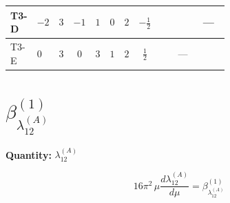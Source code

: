 \documentclass[8pt]{article}
\begin{document}
\begin{landscape}
\begin{longtable}{@{}llcccccc >{\raggedright\arraybackslash}p{0.21\linewidth} >{\raggedright\arraybackslash}p{0.21\linewidth} >{\raggedright\arraybackslash}p{0.21\linewidth}@{}}
\midrule
T3-D & $-2$ & $3$ & $-1$ & $1$ & $0$ & $2$ & $-\frac{1}{2}$ & \scriptsize\adjustbox{max width=\linewidth}{$\begin{gathered} -\frac{9 {g_1}^2 {\lambda_5}}{2}\end{gathered}$} & \scriptsize\adjustbox{max width=\linewidth}{$\begin{gathered} {\lambda_5} (T_{\nu}^{(1)}+2 T_{\nu}^{(2)}+6 \operatorname{Tr}\!\left({Y_d}\,\left({Y_d}\right)^{\dagger}\right)+2 \operatorname{Tr}\!\left({Y_e}\,\left({Y_e}\right)^{\dagger}\right)+6 \operatorname{Tr}\!\left({Y_u}\,\left({Y_u}\right)^{\dagger}\right)-4 {\lambda_{HS_1}^{(A)}})\end{gathered}$} & --- \\
\midrule
T3-E & $0$ & $3$ & $0$ & $3$ & $1$ & $2$ & $\frac{1}{2}$ & \scriptsize\adjustbox{max width=\linewidth}{$\begin{gathered} -\frac{9 {g_1}^2 {\lambda_5}}{2}\end{gathered}$} & --- & \scriptsize\adjustbox{max width=\linewidth}{$\begin{gathered} {\lambda_5} \left(T_{\nu}^{(1)}+T_{\nu}^{(2)}+6 \operatorname{Tr}\!\left({Y_d}\,\left({Y_d}\right)^{\dagger}\right)+2 \operatorname{Tr}\!\left({Y_e}\,\left({Y_e}\right)^{\dagger}\right)+6 \operatorname{Tr}\!\left({Y_u}\,\left({Y_u}\right)^{\dagger}\right)-\frac{4 {\lambda_{12}^{(A)}}}{3}-2 {\lambda_{12}^{(\times)}}-2 {\lambda_{HS_1}^{(A)}}-\frac{4 {\lambda_{HS_2}^{(A)}}}{3}\right)\end{gathered}$} \\
\midrule
\bottomrule
\end{longtable}
\clearpage
\section*{$\beta_{\lambda_{12}^{(A)}}^{(1)}$}
\noindent\textbf{Quantity: }$\lambda_{12}^{(A)}$\par\smallskip
\[16\pi^2\,\mu\frac{d \lambda_{12}^{(A)}}{d\mu}=\beta_{\lambda_{12}^{(A)}}^{(1)}\]

\end{landscape}
\end{document}
